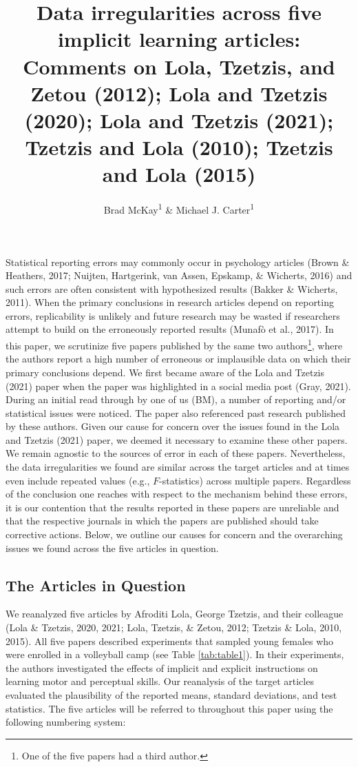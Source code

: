 \documentclass[
  english,
  man,floatsintext]{apa7}
\title{Data irregularities across five implicit learning articles: Comments on Lola, Tzetzis, and Zetou (2012); Lola and Tzetzis (2020); Lola and Tzetzis (2021); Tzetzis and Lola (2010); Tzetzis and Lola (2015)}
\author{Brad McKay\textsuperscript{1} \& Michael J. Carter\textsuperscript{1}}
\date{}
\affiliation{\vspace{0.5cm}\textsuperscript{1} Department of Kinesiology, McMaster University}
\begin{document}
\maketitle

Statistical reporting errors may commonly occur in psychology articles (Brown \& Heathers, 2017; Nuijten, Hartgerink, van Assen, Epskamp, \& Wicherts, 2016) and such errors are often consistent with hypothesized results (Bakker \& Wicherts, 2011). When the primary conclusions in research articles depend on reporting errors, replicability is unlikely and future research may be wasted if researchers attempt to build on the erroneously reported results (Munafò et al., 2017). In this paper, we scrutinize five papers published by the same two authors\footnote{One of the five papers had a third author.}, where the authors report a high number of erroneous or implausible data on which their primary conclusions depend. We first became aware of the Lola and Tzetzis (2021) paper when the paper was highlighted in a social media post (Gray, 2021). During an initial read through by one of us (BM), a number of reporting and/or statistical issues were noticed. The paper also referenced past research published by these authors. Given our cause for concern over the issues found in the Lola and Tzetzis (2021) paper, we deemed it necessary to examine these other papers. We remain agnostic to the sources of error in each of these papers. Nevertheless, the data irregularities we found are similar across the target articles and at times even include repeated values (e.g., \(F\)-statistics) across multiple papers. Regardless of the conclusion one reaches with respect to the mechanism behind these errors, it is our contention that the results reported in these papers are unreliable and that the respective journals in which the papers are published should take corrective actions. Below, we outline our causes for concern and the overarching issues we found across the five articles in question.

\hypertarget{the-articles-in-question}{%
\subsection{The Articles in Question}\label{the-articles-in-question}}

We reanalyzed five articles by Afroditi Lola, George Tzetzis, and their colleague (Lola \& Tzetzis, 2020, 2021; Lola, Tzetzis, \& Zetou, 2012; Tzetzis \& Lola, 2010, 2015). All five papers described experiments that sampled young females who were enrolled in a volleyball camp (see Table \ref{tab:table1}). In their experiments, the authors investigated the effects of implicit and explicit instructions on learning motor and perceptual skills. Our reanalysis of the target articles evaluated the plausibility of the reported means, standard deviations, and test statistics. The five articles will be referred to throughout this paper using the following numbering system:
\end{document}

